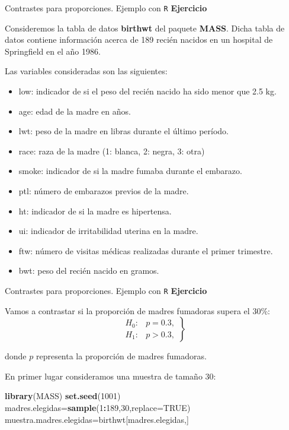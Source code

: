 \documentclass[
  ignorenonframetext,
]{beamer}
\newenvironment{Shaded}{\begin{snugshade}}{\end{snugshade}}
\newcommand{\DataTypeTok}[1]{\textcolor[rgb]{0.13,0.29,0.53}{#1}}
\newcommand{\DecValTok}[1]{\textcolor[rgb]{0.00,0.00,0.81}{#1}}
\newcommand{\KeywordTok}[1]{\textcolor[rgb]{0.13,0.29,0.53}{\textbf{#1}}}
\newcommand{\NormalTok}[1]{#1}
\newcommand{\OperatorTok}[1]{\textcolor[rgb]{0.81,0.36,0.00}{\textbf{#1}}}
\newcommand{\OtherTok}[1]{\textcolor[rgb]{0.56,0.35,0.01}{#1}}
\providecommand{\tightlist}{%
  \setlength{\itemsep}{0pt}\setlength{\parskip}{0pt}}
\begin{document}
\begin{frame}{Contrastes para proporciones. Ejemplo con \texttt{R}}
\protect\hypertarget{contrastes-para-proporciones.-ejemplo-con-r-1}{}
\textbf{Ejercicio}

Consideremos la tabla de datos \textbf{birthwt} del paquete
\textbf{MASS}. Dicha tabla de datos contiene información acerca de 189
recién nacidos en un hospital de Springfield en el año 1986.

Las variables consideradas son las siguientes:

\begin{itemize}[<+->]
\tightlist
\item
  low: indicador de si el peso del recién nacido ha sido menor que 2.5
  kg.
\item
  age: edad de la madre en años.
\item
  lwt: peso de la madre en libras durante el último período.
\item
  race: raza de la madre (1: blanca, 2: negra, 3: otra)
\item
  smoke: indicador de si la madre fumaba durante el embarazo.
\item
  ptl: número de embarazos previos de la madre.
\item
  ht: indicador de si la madre es hipertensa.
\item
  ui: indicador de irritabilidad uterina en la madre.
\item
  ftw: número de visitas médicas realizadas durante el primer trimestre.
\item
  bwt: peso del recién nacido en gramos.
\end{itemize}
\end{frame}

\begin{frame}[fragile]{Contrastes para proporciones. Ejemplo con
\texttt{R}}
\protect\hypertarget{contrastes-para-proporciones.-ejemplo-con-r-2}{}
\textbf{Ejercicio}

Vamos a contrastar si la proporción de madres fumadoras supera el 30\%:
\[
\left.
\begin{array}{ll}
H_0: & p = 0.3, \\
H_1: & p> 0.3,
\end{array}
\right\}
\]

donde \(p\) representa la proporción de madres fumadoras.

En primer lugar consideramos una muestra de tamaño 30:

\begin{Shaded}
\begin{Highlighting}[]
\KeywordTok{library}\NormalTok{(MASS)}
\KeywordTok{set.seed}\NormalTok{(}\DecValTok{1001}\NormalTok{)}
\NormalTok{madres.elegidas=}\KeywordTok{sample}\NormalTok{(}\DecValTok{1}\OperatorTok{:}\DecValTok{189}\NormalTok{,}\DecValTok{30}\NormalTok{,}\DataTypeTok{replace=}\OtherTok{TRUE}\NormalTok{)}
\NormalTok{muestra.madres.elegidas=birthwt[madres.elegidas,]}
\end{Highlighting}
\end{Shaded}
\end{frame}
\end{document}
